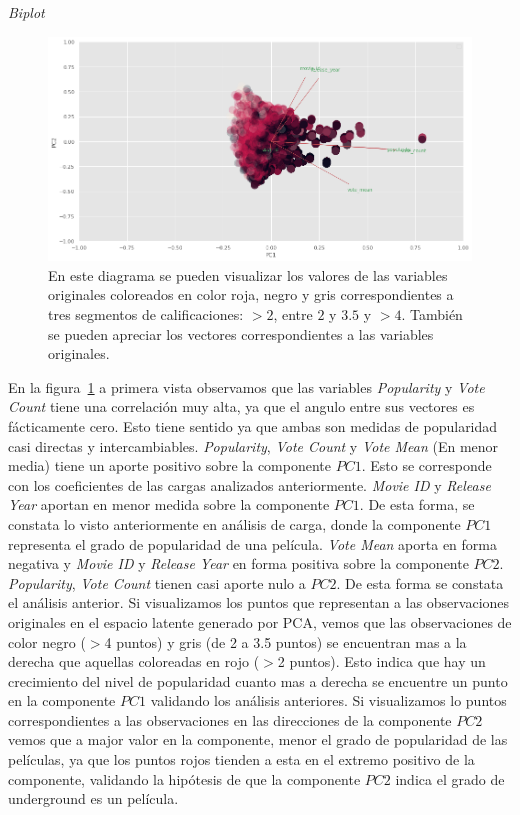 \documentclass[11pt,a4paper,twoside]{thesis}
\begin{document}
\clearpage

\begin{description}
	\item[\textit{Biplot}]
\end{description}

\begin{figure}[h!]
	\centering
	\includegraphics[width=15cm]{./images/PCA-biplot.png}
	\caption{En este diagrama se pueden visualizar los valores de las variables originales coloreados en color roja, negro y gris correspondientes a tres segmentos de calificaciones: $>2$, entre $2$ y $3.5$ y $>4$. También se pueden apreciar los vectores correspondientes a las variables originales.}
	\label{fig:biplot}
\end{figure}

En la figura~\ref{fig:biplot} a primera vista observamos que las variables
\textit{Popularity} y \textit{Vote Count} tiene una correlación muy alta, ya
que el angulo entre sus vectores es fácticamente cero. Esto tiene sentido ya
que ambas son medidas de popularidad casi directas y intercambiables.
\textit{Popularity}, \textit{Vote Count} y \textit{Vote Mean} (En menor media)
tiene un aporte positivo sobre la componente $PC1$. Esto se corresponde con los
coeficientes de las cargas analizados anteriormente. \textit{Movie ID } y
\textit{Release Year} aportan en menor medida sobre la componente $PC1$. De
esta forma, se constata lo visto anteriormente en análisis de carga, donde la
componente $PC1$ representa el grado de popularidad de una película.
\textit{Vote Mean} aporta en forma negativa y \textit{Movie ID } y
\textit{Release Year} en forma positiva sobre la componente $PC2$.
\textit{Popularity}, \textit{Vote Count} tienen casi aporte nulo a $PC2$. De
esta forma se constata el análisis anterior. Si visualizamos los puntos que
representan a las observaciones originales en el espacio latente generado por
PCA, vemos que las observaciones de color negro ($>$4 puntos) y gris (de 2 a
3.5 puntos) se encuentran mas a la derecha que aquellas coloreadas en rojo
($>$2 puntos). Esto indica que hay un crecimiento del nivel de popularidad
cuanto mas a derecha se encuentre un punto en la componente $PC1$ validando los
análisis anteriores. Si visualizamos lo puntos correspondientes a las
observaciones en las direcciones de la componente $PC2$ vemos que a major valor
en la componente, menor el grado de popularidad de las películas, ya que los
puntos rojos tienden a esta en el extremo positivo de la componente, validando
la hipótesis de que la componente $PC2$ indica el grado de underground es un
película.
\end{document}
